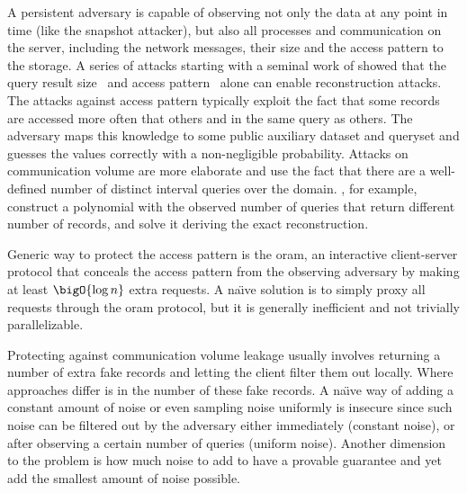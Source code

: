 			A persistent adversary is capable of observing not only the data at any point in time (like the snapshot attacker), but also all processes and communication on the server, including the network messages, their size and the access pattern to the storage.
			A series of attacks starting with a seminal work of \textcite{generic-attacks-kellaris} showed that the query result size~\cite{generic-attacks-kellaris, state-of-uniform, attacks-improved-reconstruction, pump-volume-attacks, volume-range-attacks} and access pattern~\cite{multidimensional-range-queries, inference-attack-islam-14, leakage-abuse-attacks-cash-15, inference-attacks-naveed-15, generic-attacks-kellaris, attacks-tao-of-inference, grubbs-attacks, access-pattern-disclosure, attacks-improved-reconstruction} alone can enable reconstruction attacks.
			The attacks against access pattern typically exploit the fact that some records are accessed more often that others and in the same query as others.
			The adversary maps this knowledge to some public auxiliary dataset and queryset and guesses the values correctly with a non-negligible probability.
			Attacks on communication volume are more elaborate and use the fact that there are a well-defined number of distinct interval queries over the domain.
			\textcite{generic-attacks-kellaris}, for example, construct a polynomial with the observed number of queries that return different number of records, and solve it deriving the exact reconstruction.

			Generic way to protect the access pattern is the \acrfull{oram}, an interactive client-server protocol that conceals the access pattern from the observing adversary by making at least $\bigO{\log n}$ extra requests.
			A na\"{\i}ve solution is to simply proxy all requests through the \acrshort{oram} protocol, but it is generally inefficient and not trivially parallelizable.

			Protecting against communication volume leakage usually involves returning a number of extra fake records and letting the client filter them out locally.
			Where approaches differ is in the number of these fake records.
			A na\"{\i}ve way of adding a constant amount of noise or even sampling noise uniformly is insecure since such noise can be filtered out by the adversary either immediately (constant noise), or after observing a certain number of queries (uniform noise).
			Another dimension to the problem is how much noise to add to have a provable guarantee and yet add the smallest amount of noise possible.

